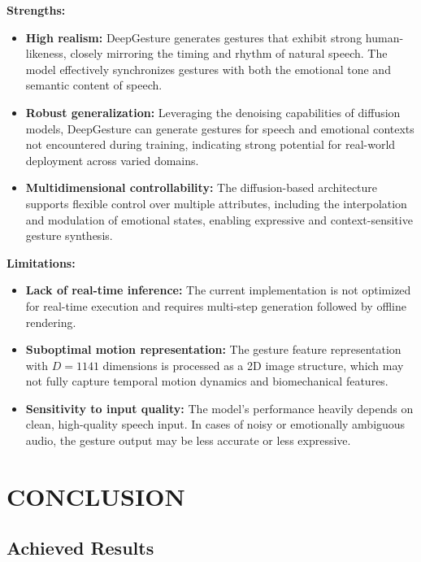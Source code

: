 \textbf{Strengths:}

\begin{itemize}
	\item \textbf{High realism:} DeepGesture generates gestures that exhibit strong human-likeness, closely mirroring the timing and rhythm of natural speech. The model effectively synchronizes gestures with both the emotional tone and semantic content of speech.
	
	\item \textbf{Robust generalization:} Leveraging the denoising capabilities of diffusion models, DeepGesture can generate gestures for speech and emotional contexts not encountered during training, indicating strong potential for real-world deployment across varied domains.
	
	\item \textbf{Multidimensional controllability:} The diffusion-based architecture supports flexible control over multiple attributes, including the interpolation and modulation of emotional states, enabling expressive and context-sensitive gesture synthesis.
\end{itemize}

\textbf{Limitations:}

\begin{itemize}
	\item \textbf{Lack of real-time inference:} The current implementation is not optimized for real-time execution and requires multi-step generation followed by offline rendering.
	
	\item \textbf{Suboptimal motion representation:} The gesture feature representation with $D=1141$ dimensions is processed as a 2D image structure, which may not fully capture temporal motion dynamics and biomechanical features.
	
	\item \textbf{Sensitivity to input quality:} The model’s performance heavily depends on clean, high-quality speech input. In cases of noisy or emotionally ambiguous audio, the gesture output may be less accurate or less expressive.
\end{itemize}


\section{CONCLUSION}
\label{sec:conclusion}



\subsection{Achieved Results}

